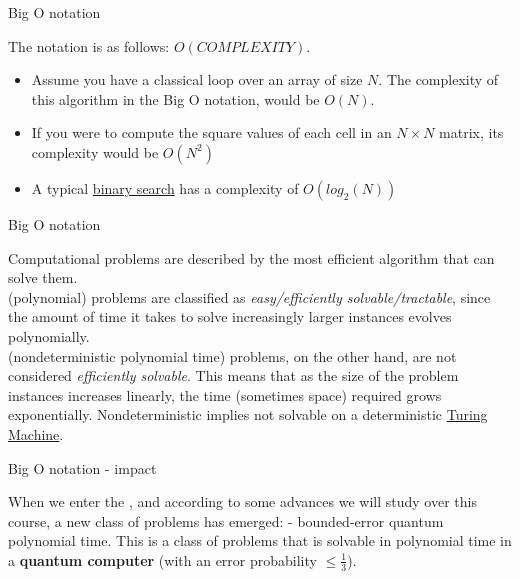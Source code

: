 \documentclass[aspectratio=43]{beamer}
\begin{document}
\begin{frame}{Big O notation}
\begin{card}
The notation is as follows: $O(COMPLEXITY)$.\\
\begin{itemize}
    \item Assume you have a classical loop over an array of size $N$. The complexity of this algorithm in the Big O notation, would be $O(N)$.
    \item If you were to compute the square values of each cell in an $N\times N$ matrix, its complexity would be $O(N^2)$
    \item A typical \href{https://en.wikipedia.org/wiki/Binary_search_algorithm}{binary search} has a complexity of $O(log_2(N))$
\end{itemize}
\end{card}
\pagenumber
\end{frame}

\begin{frame}{Big O notation}
\begin{card}
    Computational problems are described by the most efficient algorithm that can solve them.\\ \p (polynomial) problems are classified as \textit{easy/efficiently solvable/tractable}, since the amount of time it takes to solve increasingly larger instances evolves polynomially.\\
    \np (nondeterministic polynomial time) problems, on the other hand, are not considered \textit{efficiently solvable}. This means that as the size of the problem instances increases linearly, the time (sometimes space) required grows exponentially. Nondeterministic implies not solvable on a deterministic \href{https://en.wikipedia.org/wiki/Turing_machine}{Turing Machine}.
\end{card}
\pagenumber
\end{frame}

\begin{frame}{Big O notation - \q impact}
\begin{card}[BQP]
    When we enter the \qw, and according to some advances we will study over this course, a new class of problems has emerged: \bqp - bounded-error quantum polynomial time. This is a class of problems that is solvable in polynomial time in a \textbf{quantum computer} (with an error probability $\leq \frac{1}{3}$).
\end{card}
\pagenumber
\end{frame}
\end{document}
